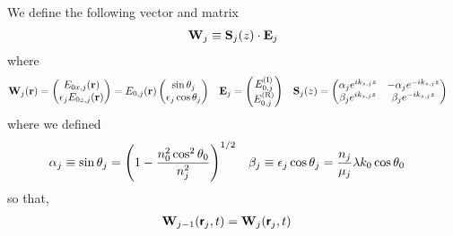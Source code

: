 We define the following vector and matrix
\begin{align*}
	\vb{W}_j \equiv \vb{S}_j\pqty{z}\cdot\vb{E}_j
\end{align*} where
\begin{align*}
	\vb{W}_j\pqty{\vb{r}}  & = \pmqty{E_{0x,j}\pqty{\vb{r}}                                 \\ \epsilon_j E_{0z,j}\pqty{\vb{r}}} = E_{0,j}\pqty{\vb{r}}\pmqty{\sin\theta_j \\ \epsilon_j \cos\theta_j}
	                       & \vb{E}_j                       & = \pmqty{E_{0,j}^{\text{(I)}} \\ E_{0,j}^{\text{(R)}}}
	                       &
	\vb{S}_j\pqty{z}       & = \pmqty{
	\alpha_j e^{ik_{z,j}z} &
	-\alpha_j e^{-ik_{z,j}z}                                                                \\
	\beta_j e^{ik_{z,j}z}  &
	\beta_j e^{-ik_{z,j}z}}
\end{align*} where we defined
\begin{align*}
	\alpha_j & \equiv \sin\theta_j = \pqty{1 - \frac{n_0^2\cos^2\theta_0}{n_{j}^2}}^{1/2} & \beta_j & \equiv \epsilon_j\cos\theta_j  = \frac{n_j}{\mu_j} \lambda k_0 \cos\theta_0
\end{align*}so that,
\begin{align*}
	\vb{W}_{j-1}\pqty{\boldsymbol{\mathsf{r}}_j,t} & = \vb{W}_{j}\pqty{\boldsymbol{\mathsf{r}}_j,t}
\end{align*}

